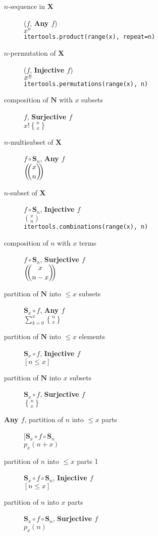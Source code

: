 \documentclass[]{article}
\newcommand{\fallingfactorial}[1]{%
  ^{\mspace{1mu}\underline{#1\mspace{-2mu}}\mspace{2mu}}%
}
\newcommand{\stirlingii}{\genfrac{\{}{\}}{0pt}{}}
\newcommand{\multichoose}[2]{\bigg(\!\!\dbinom{#1}{#2}\!\!\bigg)}
\begin{document}
\begin{description}

\item [$n$-sequence in $\mathbf{X}$] ($f$, \textbf{Any $f$})
\\ $x^n$
\\ \texttt{itertools.product(range(x), repeat=n)}

\item [$n$-permutation of $\mathbf{X}$] ($f$, \textbf{Injective $f$})
\\ $x\fallingfactorial{n}$
\\ \texttt{itertools.permutations(range(x), n)}

\item [composition of $\mathbf{N}$ with $x$ subsets] $f$, \textbf{Surjective $f$}
\\ $x! \stirlingii{n}{x}$

\item [$n$-multisubset of $\mathbf{X}$] $f \circ \mathbf{S}_n$, \textbf{Any $f$}
\\ $\multichoose{x}{n}$

\item [$n$-subset of $\mathbf{X}$] $f \circ \mathbf{S}_n$, \textbf{Injective $f$}
\\ $\binom{x}{n}$
\\ \texttt{itertools.combinations(range(x), n)}

\item [composition of $n$ with $x$ terms] $f \circ \mathbf{S}_n$, \textbf{Surjective $f$}
\\ $\multichoose{x}{n-x}$

\item [partition of $\mathbf{N}$ into $\leq x$ subsets] $\mathbf{S}_x \circ f$, \textbf{Any $f$}
\\ $\sum_{k=0}^{x} \stirlingii{n}{x}$

\item [partition of $\mathbf{N}$ into $\leq x$ elements] $\mathbf{S}_x \circ f$, \textbf{Injective $f$}
\\ $[n \leq x]$

\item [partition of $\mathbf{N}$ into $x$ subsets] $\mathbf{S}_x \circ f$, \textbf{Surjective $f$}
\\ $\stirlingii{n}{x}$

\item [\textbf{Any $f$}, partition of $n$ into $\leq x$ parts] [$\mathbf{S}_x \circ f \circ \mathbf{S}_n$
\\ $p_x(n+x)$

\item [partition of $n$ into $\leq x$ parts 1] $\mathbf{S}_x \circ f \circ \mathbf{S}_n$, \textbf{Injective $f$}
\\ $[n \leq x]$

\item [partition of $n$ into $x$ parts] $\mathbf{S}_x \circ f \circ \mathbf{S}_n$, \textbf{Surjective $f$}
\\ $p_x(n)$

\end{description}




\printbibliography
\end{document}
